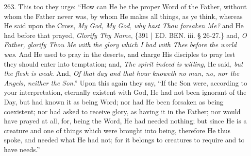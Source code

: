 263.
This too they urge: ``How can He be the proper Word of the Father,
without whom the Father never was, by whom He makes all things, as ye
think, whereas He said upon the Cross, \emph{My God, My God, why hast
Thou forsaken Me?} and He had before that prayed, \emph{Glorify Thy
Name}, \{391 | ED.
BEN.
iii. § 26-27.\} and, \emph{O Father, glorify Thou Me with the glory which
I had with Thee before the world was}. And He used to pray in the
deserts, and charge His disciples to pray lest they should enter into
temptation; and, \emph{The spirit indeed is willing}, He said, \emph{but
the flesh is weak}. And, \emph{Of that day and that hour knoweth no
man, no, nor the Angels, neither the Son}.'' Upon this again they
say, ``If the Son were, according to your interpretation, eternally
existent with God, He had not been ignorant of the Day, but had known
it as being Word; nor had He been forsaken as being coexistent; nor
had asked to receive glory, as having it in the Father; nor would have
prayed at all, for, being the Word, He had needed nothing; but since
He is a creature and one of things which were brought into being,
therefore He thus spoke, and needed what He had not; for it belongs to
creatures to require and to have needs.''

